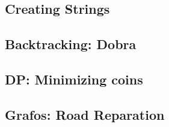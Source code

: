 

\subsection{Creating Strings}



\subsection{Backtracking: Dobra}



\subsection{DP: Minimizing coins}



\subsection{Grafos: Road Reparation}


